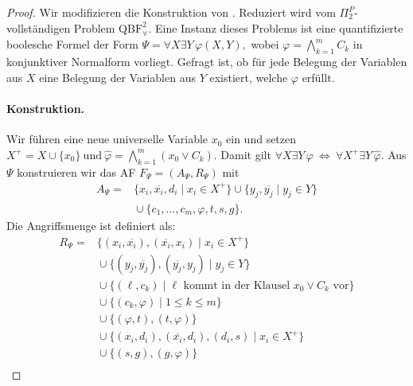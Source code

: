 \begin{proof}
    \label{pr:ocf-af-ci-co-pi^2-c-is-correct}
    Wir modifizieren die Konstruktion von \textcite{bluemel:2025:independence-aba}.
    Reduziert wird vom \(\Pi_2^P\)-vollständigen Problem
    \(\mathrm{QBF}^{2}_{\forall}\). Eine Instanz dieses Problems ist
    eine quantifizierte boolesche Formel der Form
    \(\Psi=\forall X\exists Y\,\varphi(X,Y), \)
    wobei \(\varphi=\bigwedge_{k=1}^{m}C_k\) in konjunktiver
    Normalform vorliegt. Gefragt ist, ob für jede Belegung der
    Variablen aus \(X\) eine Belegung der Variablen aus \(Y\)
    existiert, welche \(\varphi\) erfüllt.


    \paragraph{Konstruktion.}
    Wir führen eine neue universelle
    Variable \(x_0\) ein und setzen
    \( X^{+}=X\cup\{x_0\}~
        \text{und}~
        \widehat{\varphi}
        =
        \bigwedge_{k=1}^{m}(x_0\lor C_k).\)
    Damit gilt
    \(
        \forall X\exists Y\,\varphi~
        \Longleftrightarrow~
        \forall X^{+}\exists Y\,\widehat{\varphi}.
    \)   
    Aus \(\Psi\) konstruieren wir das AF
    \(F_{\Psi}=(A_{\Psi},R_{\Psi})\) mit
    \[
    \begin{split}
        A_{\Psi}={}&
        \{x_i,\overline{x_i},d_i\mid x_i\in X^{+}\}
        \cup
        \{y_j,\overline{y_j}\mid y_j\in Y\}\\
        &{}\cup
        \{c_1,\ldots,c_m,\varphi,t,s,g\}.
    \end{split}
    \]
    Die Angriffsmenge ist definiert als:
    \[
    \begin{split}
        R_{\Psi}={}&
        \{(x_i,\overline{x_i}),(\overline{x_i},x_i)
            \mid x_i\in X^{+}\}\\
        &{}\cup
        \{(y_j,\overline{y_j}),(\overline{y_j},y_j)
            \mid y_j\in Y\}\\
        &{}\cup
        \{(\ell,c_k)
            \mid \ell\text{ kommt in der Klausel }
            x_0\lor C_k\text{ vor}\}\\
        &{}\cup
        \{(c_k,\varphi)\mid 1\leq k\leq m\}\\
        &{}\cup
        \{(\varphi,t),(t,\varphi)\}\\
        &{}\cup
        \{(x_i,d_i),(\overline{x_i},d_i),(d_i,s)
            \mid x_i\in X^{+}\}\\
        &{}\cup
        \{(s,g),(g,\varphi)\}\\

\end{split}\]
\end{proof}
